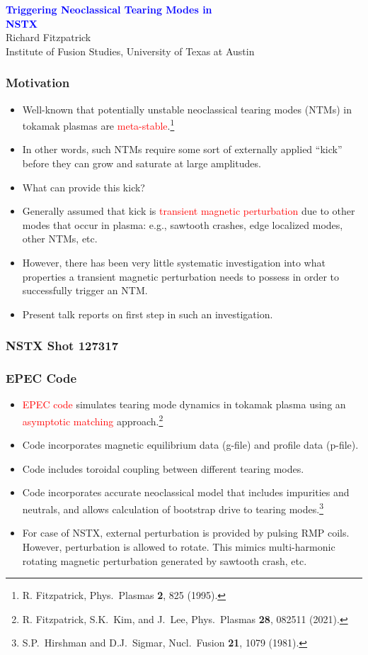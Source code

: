 \documentclass{beamer}
\newcommand{\blue}[1]{\textcolor{blue}{#1}}
\newcommand{\red}[1]{\textcolor{red}{#1}}
\begin{document}
\begin{frame}
\begin{center}
\blue{\Large\bf Triggering Neoclassical Tearing Modes in}\\[0.5ex]
 \blue{\Large\bf NSTX}\\[2ex]
Richard Fitzpatrick\\[0.5ex]
Institute of Fusion Studies, University of Texas at Austin
\end{center}


\end{frame}

\begin{frame}
\frametitle{Motivation}
 
\begin{itemize}
\item Well-known that potentially unstable neoclassical tearing modes (NTMs) in tokamak plasmas are \red{meta-stable}.\footnote{R. Fitzpatrick, 
Phys.\ Plasmas {\bf 2}, 825 (1995).}
\item In other words, such NTMs require some sort of externally applied ``kick'' before they can grow and saturate at large amplitudes.
\item What can provide this kick? 
\item Generally assumed that kick is \red{transient magnetic perturbation} due to other modes that occur in plasma: e.g., sawtooth crashes, edge localized modes, other NTMs, etc.
\item However, there has been very little systematic investigation into what properties a transient magnetic
perturbation needs to possess in order to successfully trigger an NTM. 
\item Present talk reports on first step in such an investigation. 
\end{itemize}
\end{frame}

\begin{frame}
\frametitle{NSTX Shot 127317}
\frametitle{EPEC Code}
 
\begin{itemize}
\item \red{EPEC code} simulates tearing mode dynamics in tokamak plasma using an \red{asymptotic matching} approach.\footnote{R. Fitzpatrick, S.K.~Kim, and J.~Lee, Phys.\ Plasmas {\bf 28}, 082511 (2021).}  
\item Code incorporates magnetic equilibrium data (g-file) and profile data (p-file). 
\item Code includes toroidal coupling between different tearing modes. 
\item Code incorporates accurate neoclassical model that includes impurities and neutrals, and allows calculation of bootstrap
drive to tearing modes.\footnote{S.P.~Hirshman and D.J.~Sigmar, Nucl.\ Fusion {\bf 21}, 1079 (1981).} 
\item For case of NSTX, external perturbation is provided by pulsing RMP coils. However, perturbation is allowed to rotate.
This mimics multi-harmonic rotating magnetic perturbation generated by sawtooth crash, etc.
\end{itemize}
\end{frame}
\end{document}
